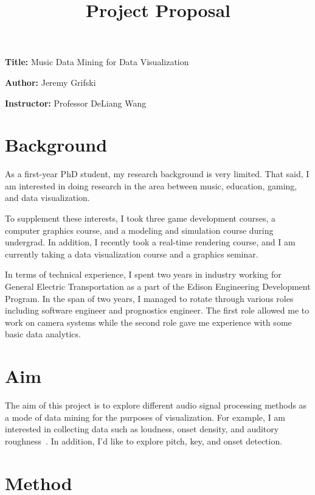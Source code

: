 \documentclass[12pt, a4paper]{article}
\title{Project Proposal}
\author{}
\date{}
\newcommand{\namelistlabel}[1]{\mbox{#1}\hfil}
\newenvironment{namelist}[1]{%
\begin{list}{}
    {
        \let\makelabel\namelistlabel
        \settowidth{\labelwidth}{#1}
        \setlength{\leftmargin}{1.1\labelwidth}
    }
  }{%
\end{list}}
\begin{document}
\maketitle

\begin{namelist}{xxxxxxxxxxxx}
\item[{\bf Title:}]
	Music Data Mining for Data Visualization
\item[{\bf Author:}]
	Jeremy Grifski
\item[{\bf Instructor:}]
	Professor DeLiang Wang
\end{namelist}

\section*{Background}

As a first-year PhD student, my research background is very limited. That said,
I am interested in doing research in the area between music, education, gaming,
and data visualization.

To supplement these interests, I took three game development courses, a
computer graphics course, and a modeling and simulation course during undergrad.
In addition, I recently took a real-time rendering course, and I am
currently taking a data visualization course and a graphics seminar.

In terms of technical experience, I spent two years in industry working for
General Electric Transportation as a part of the Edison Engineering Development
Program. In the span of two years, I managed to rotate through various roles
including software engineer and prognostics engineer. The first role allowed
me to work on camera systems while the second role gave me experience with
some basic data analytics.

\section*{Aim}

The aim of this project is to explore different audio signal processing methods
as a mode of data mining for the purposes of visualization. For example, I am
interested in collecting data such as loudness, onset density, and auditory
roughness~\cite{knuth}. In addition, I'd like to explore pitch, key, and onset
detection.

\section*{Method}
\end{document}
